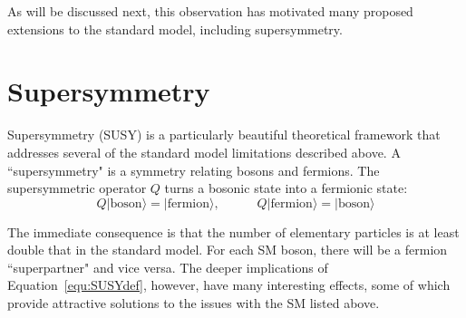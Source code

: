 As will be discussed next, this observation has motivated many proposed extensions to the standard model, including supersymmetry.







\section{Supersymmetry}
\label{sec:SUSY}

Supersymmetry (SUSY) is a particularly beautiful theoretical framework that addresses several of the standard model limitations described above. A ``supersymmetry" is a symmetry relating bosons and fermions. The supersymmetric operator $Q$ turns a bosonic state into a fermionic state:
\begin{equation}
Q|\mathrm{boson}\rangle = |\mathrm{fermion}\rangle, \hspace{35pt} Q|\mathrm{fermion}\rangle = |\mathrm{boson}\rangle
\label{equ:SUSYdef}
\end{equation}

The immediate consequence is that the number of elementary particles is at least double that in the standard model. For each SM boson, there will be a fermion ``superpartner" and vice versa. The deeper implications of Equation~\ref{equ:SUSYdef}, however, have many interesting effects, some of which 
provide attractive solutions to the issues with the SM listed above.

